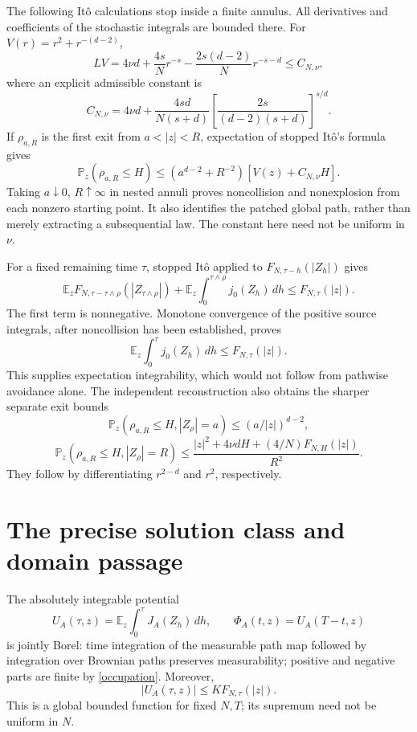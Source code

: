 \documentclass[11pt]{article}
\newcommand{\E}{\mathbb E}
\newcommand{\Prob}{\mathbb P}
\begin{document}
The following It\^o calculations stop inside a finite annulus.
All derivatives and coefficients of the stochastic integrals are bounded there.
For $V(r)=r^2+r^{-(d-2)}$,
\[
 LV=4\nu d+\frac{4s}{N}r^{-s}
       -\frac{2s(d-2)}N r^{-s-d}\le C_{N,\nu},
\]
where an explicit admissible constant is
\[
 C_{N,\nu}=4\nu d+
 \frac{4sd}{N(s+d)}
 \left[\frac{2s}{(d-2)(s+d)}\right]^{s/d}.
\]
If $\rho_{a,R}$ is the first exit from $a<|z|<R$, expectation of
stopped It\^o's formula gives
\[
 \Prob_z(\rho_{a,R}\le H)
 \le(a^{d-2}+R^{-2})[V(z)+C_{N,\nu}H].
\]
Taking $a\downarrow0$, $R\uparrow\infty$ in nested annuli proves
noncollision and nonexplosion from each nonzero starting point. It
also identifies the patched global path, rather than merely extracting
a subsequential law. The constant here need not be uniform in $\nu$.

For a fixed remaining time $\tau$, stopped It\^o applied to
$F_{N,\tau-h}(|Z_h|)$ gives
\[
 \E_zF_{N,\tau-\tau\wedge\rho}(|Z_{\tau\wedge\rho}|)
 +\E_z\int_0^{\tau\wedge\rho}j_0(Z_h)\,dh
 \le F_{N,\tau}(|z|).
\]
The first term is nonnegative. Monotone convergence of the positive
source integrals, after noncollision has been established, proves
\begin{equation}\label{occupation}
 \E_z\int_0^\tau j_0(Z_h)\,dh\le F_{N,\tau}(|z|).
\end{equation}
This supplies expectation integrability, which would not follow from
pathwise avoidance alone. The independent reconstruction also obtains
the sharper separate exit bounds
\[
 \Prob_z(\rho_{a,R}\le H,|Z_\rho|=a)\le(a/|z|)^{d-2},
\]
\[
 \Prob_z(\rho_{a,R}\le H,|Z_\rho|=R)
 \le\frac{|z|^2+4\nu dH+(4/N)F_{N,H}(|z|)}{R^2}.
\]
They follow by differentiating $r^{2-d}$ and $r^2$, respectively.

\section{The precise solution class and domain passage}
The absolutely integrable potential
\[
 U_A(\tau,z)=\E_z\int_0^\tau J_A(Z_h)\,dh,
 \qquad\Phi_A(t,z)=U_A(T-t,z)
\]
is jointly Borel: time integration of the measurable path map followed
by integration over Brownian paths preserves measurability; positive
and negative parts are finite by \eqref{occupation}. Moreover,
\begin{equation}\label{comparison}
 |U_A(\tau,z)|\le K F_{N,\tau}(|z|).
\end{equation}
This is a global bounded function for fixed $N,T$; its supremum need
not be uniform in $N$.
\end{document}
